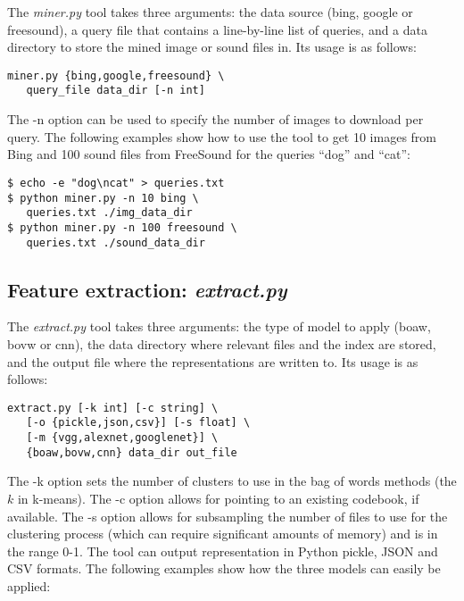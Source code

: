 \documentclass[11pt]{article}
\begin{document}
The \emph{miner.py} tool takes three arguments: the data source (bing, google or freesound), a query file that contains a line-by-line list of queries, and a data directory to store the mined image or sound files in. Its usage is as follows:

\begin{small}
\begin{verbatim}
miner.py {bing,google,freesound} \
   query_file data_dir [-n int]
\end{verbatim}
\end{small}

\noindent The -n option can be used to specify the number of images to download per query. The following examples show how to use the tool to get 10 images from Bing and 100 sound files from FreeSound for the queries ``dog'' and ``cat'':

\begin{small}
\begin{verbatim}
$ echo -e "dog\ncat" > queries.txt
$ python miner.py -n 10 bing \
   queries.txt ./img_data_dir
$ python miner.py -n 100 freesound \
   queries.txt ./sound_data_dir
\end{verbatim}
\end{small}

\subsection{Feature extraction: \emph{extract.py}}

The \emph{extract.py} tool takes three arguments: the type of model to apply (boaw, bovw or cnn), the data directory where relevant files and the index are stored, and the output file where the representations are written to. Its usage is as follows:

\begin{small}
\begin{verbatim}
extract.py [-k int] [-c string] \
   [-o {pickle,json,csv}] [-s float] \
   [-m {vgg,alexnet,googlenet}] \
   {boaw,bovw,cnn} data_dir out_file
\end{verbatim}
\end{small}

\noindent The -k option sets the number of clusters to use in the bag of words methods (the $k$ in k-means). The -c option allows for pointing to an existing codebook, if available. The -s option allows for subsampling the number of files to use for the clustering process (which can require significant amounts of memory) and is in the range 0-1. The tool can output representation in Python pickle, JSON and CSV formats. The following examples show how the three models can easily be applied:
\end{document}
